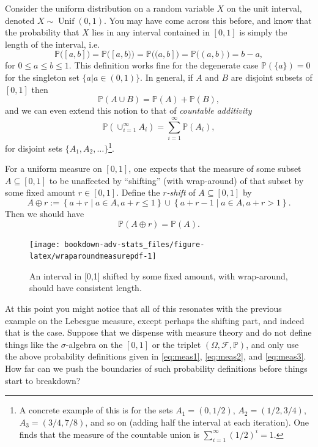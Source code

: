 \documentclass[
]{book}
\DeclareMathOperator{\Unif}{Unif}
\newcommand{\bbP}{\mathbb{P}}
\newcommand{\cF}{{\mathcal F}}
\theoremstyle{definition}
\theoremstyle{definition}
\theoremstyle{definition}
\theoremstyle{definition}
\theoremstyle{remark}
\begin{document}
Consider the uniform distribution on a random variable \(X\) on the unit interval, denoted \(X\sim\Unif(0,1)\). You may have come across this before, and know that the probability that \(X\) lies in any interval contained in \([0,1]\) is simply the length of the interval, i.e.
\begin{equation}
\bbP\big([a,b]\big) = \bbP\big([a,b)\big) = \bbP\big((a,b]\big) = \bbP\big((a,b)\big) = b-a, \label{eq:meas1}
\end{equation}
for \(0 \leq a \leq b \leq 1\). This definition works fine for the degenerate case \(\bbP(\{a\})=0\) for the singleton set \(\{a|a\in(0,1)\}\).
In general, if \(A\) and \(B\) are disjoint subsets of \([0,1]\) then
\begin{equation}
\bbP(A \cup B) = \bbP(A) + \bbP(B),
\end{equation}
and we can even extend this notion to that of \emph{countable additivity}
\begin{equation}
\bbP\left( \cup_{i=1}^\infty A_i \right) = \sum_{i=1}^\infty \bbP(A_i), \label{eq:meas2}
\end{equation}
for disjoint sets \(\{A_1,A_2,\dots\}\)\footnote{A concrete example of this is for the sets \(A_1=(0,1/2)\), \(A_2=(1/2, 3/4)\), \(A_3=(3/4,7/8)\), and so on (adding half the interval at each iteration). One finds that the measure of the countable union is \(\sum_{i=1}^\infty (1/2)^i=1\).}.

For a uniform measure on \([0,1]\), one expects that the measure of some subset \(A \subseteq [0,1]\) to be unaffected by ``shifting'' (with wrap-around) of that subset by some fixed amount \(r\in[0,1]\).
Define the \emph{\(r\)-shift} of \(A\subseteq [0,1]\) by
\[
A \oplus r := \left\{ a + r \mid a \in A, a+r \leq 1 \right\} \cup \left\{ a + r - 1 \mid a \in A, a+r > 1 \right\}.
\]
Then we should have
\begin{equation}
\bbP(A \oplus r) = \bbP(A). \label{eq:meas3}
\end{equation}

\begin{figure}

{\centering \texttt{[image: bookdown-adv-stats\_files/figure-latex/wraparoundmeasurepdf-1]} 

}

\caption{An interval in [0,1] shifted by some fixed amount, with wrap-around, should have consistent length.}\label{fig:wraparoundmeasurepdf}
\end{figure}

At this point you might notice that all of this resonates with the previous example on the Lebesgue measure, except perhaps the shifting part, and indeed that is the case.
Suppose that we dispense with measure theory and do not define things like the \(\sigma\)-algebra on the \([0,1]\) or the triplet \((\Omega,\cF,\bbP)\), and only use the above probability definitions given in \eqref{eq:meas1}, \eqref{eq:meas2}, and \eqref{eq:meas3}.
How far can we push the boundaries of such probability definitions before things start to breakdown?
\end{document}
